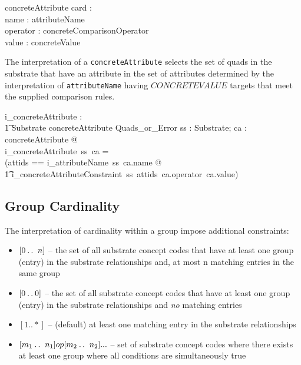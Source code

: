 \documentclass{article}
\def\spec#1{{\tt #1}}
\begin{document}
\begin{schema}{concreteAttribute}
	card : \optional[cardinality] \\
	name : attributeName \\
	operator : concreteComparisonOperator \\
	value : concreteValue
\end{schema}


The interpretation of a \spec{concreteAttribute} selects the set of quads in the substrate that have an attribute in the set of attributes 
determined by the interpretation of \spec{attributeName} having $CONCRETEVALUE$ targets that meet the supplied comparison rules.

\begin{gendef}
   i\_concreteAttribute : \\
\t1 Substrate \fun concreteAttribute \fun Quads\_or\_Error
\where
   \forall ss : Substrate; ca : concreteAttribute @ \\
   i\_concreteAttribute~ss~ca = \\
   (\LET attids == i\_attributeName~ss~ca.name @ \\
\t1 i\_concreteAttributeConstraint~ss~attids~ca.operator~ca.value)
\end{gendef}




   
 

\subsection{Group Cardinality}
The interpretation of cardinality within a group impose additional constraints:
\begin{itemize}[noitemsep,nolistsep]
\item{$[0\mathbin{\ldotp\ldotp}~n]$} -- the set of all substrate concept codes that have at least one group (entry) in the substrate relationships and,
at most n matching entries in the same group
\item{$[0\mathbin{\ldotp\ldotp}0]$} -- the set of all substrate concept codes that have at least one group (entry) in the substrate relationships and \emph{no} matching entries 
\item{$[1..*]$} -- (default) at least one matching entry in the substrate relationships
\item{$[m_1\mathbin{\ldotp\ldotp}~n_1] op [m_2\mathbin{\ldotp\ldotp}~n_2] ... $} -- set of substrate concept codes where there exists at least one group where all conditions are simultaneously true
\end{itemize}
\end{document}
